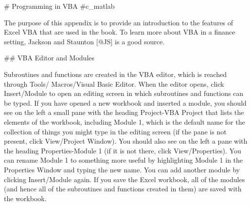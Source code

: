 # Programming in VBA {#c_matlab}

The purpose of this appendix is to provide an introduction to the
features of Excel VBA that are used in the book. To learn more about VBA
in a finance setting, Jackson and Staunton [@JS] is a good source.

## VBA Editor and Modules



Subroutines and functions are created in the VBA editor, which is reached through Tools/ Macros/Visual Basic Editor.    When the editor opens, click Insert/Module to open an editing screen in which subroutines and functions can be typed.   If you have opened a new workbook and  inserted a module, you should see on the left a small pane with the heading Project-VBA Project that lists the elements of the workbook, including Module 1, which is the default name for the collection of things you might type in the editing screen (if the pane is not present, click View/Project Window).  You should also see on the left a pane with the heading Properties-Module 1 (if it is not there, click View/Properties).  You can rename Module 1 to something more useful by highlighting Module 1 in the Properties Window and typing the new name.  You can add another module by clicking Insert/Module again.  If you save the Excel workbook, all of the modules (and hence all of the subroutines and functions created in them) are saved with the workbook.  

